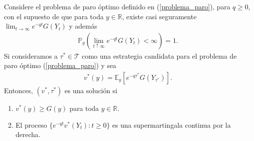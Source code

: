 \begin{lemma}
\label{condiciones_solucion}
	Considere el problema de paro óptimo definido en (\ref{problema_paro}), para $q \geq 0$, con el supuesto de que para toda $y \in \mathbb{R}$, existe casi seguramente $\lim_{t \rightarrow \infty} e^{-qt} G(Y_t)$ y además
    \begin{align}
		\mathbb{P}_y \left( \lim_{t \uparrow \infty} e^{-qt} G(Y_t) < \infty \right) = 1. \label{condicion1}
	\end{align}
    Si consideramos a $\tau^{*} \in \mathcal{T}$ como una estrategia candidata para el problema de paro óptimo (\ref{problema_paro}) y sea 
    \begin{align*}
		v^{*}(y) = \mathbb{E}_y [e^{-q \tau^{*}} G(Y_{\tau^{*}})].
	\end{align*}
Entonces, $(v^{*}, \tau^{*})$ es una solución si
  \begin{enumerate}
  	\item $v^{*}(y) \geq G(y)$ para toda $y \in \mathbb{R}$.
    \item El proceso $\{ e^{-qt} v^{*}(Y_t) : t \geq 0 \}$ es una supermartingala continua por la derecha.
  \end{enumerate}
\end{lemma}
